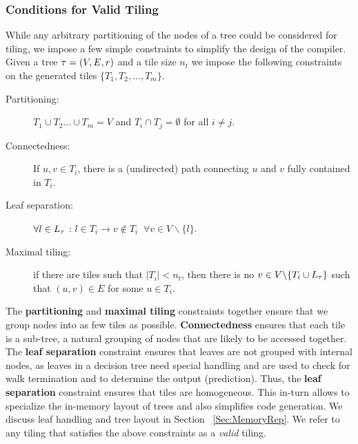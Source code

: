 \subsubsection{Conditions for Valid Tiling}
\label{sec:ValidTiling}
While any arbitrary partitioning of the nodes of a tree could be considered for tiling, we impose a 
few simple constraints to simplify the design of the compiler.
Given a tree $\operatorname{\tau} = (V, E, r)$ and a tile size $n_t$ we impose the following constraints on the generated tiles $\{ T_1, T_2, ... ,T_m \}$.
\begin{description}
    \item[Partitioning:] $T_1 \cup T_2 ... \cup T_m = V$ and $T_i \cap T_j = 
    \emptyset$ for all $i\neq j$.
    \item[Connectedness:] If $u, v \in T_i$, there is a (undirected) path connecting $u$ and $v$ fully contained in $T_i$.
   \item [Leaf separation:] $\forall l \in L_{\operatorname{\tau}}$ : $l \in T_i \rightarrow v \notin T_i \;\; \forall v \in V \backslash \{l\}$.
  \item [Maximal tiling:] if there are tiles such that $|T_i| < n_t$, then there 
is no $v \in V\backslash \{ T_i \cup L_{\operatorname{\tau}} \}$ such that $(u, v) \in E$ for 
some $u \in T_i$.  \end{description}
The \textbf{partitioning} and \textbf{maximal tiling} constraints together ensure that we group nodes into as few tiles as possible. {\textbf{Connectedness}} ensures that each tile is a sub-tree, a natural grouping of nodes that are likely to be accessed together. The {\textbf{leaf separation}} constraint ensures that leaves are not grouped with internal nodes, as leaves in a decision tree need special handling and are used to check for walk termination and to determine the output (prediction). Thus, the {\textbf{leaf separation}} constraint ensures that tiles are homogeneous. This in-turn allows \Treebeard{}  to specialize the in-memory layout of trees and also simplifies code generation. We discuss leaf handling and tree layout in Section ~\ref{Sec:MemoryRep}. We refer to any tiling that satisfies the above constraints as a \emph{valid} tiling.

